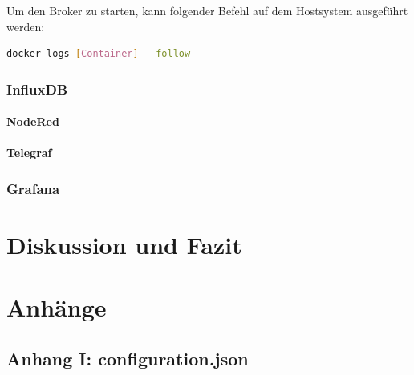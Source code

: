 \documentclass[a4paper, 12pt, oneside, toc=listofnumbered, bibliography=totoc]{scrbook}
\begin{document}
		Um den Broker zu starten, kann folgender Befehl auf dem Hostsystem ausgeführt werden:
		
		\begin{lstlisting}[numbers=none, language=bash, frame=single]
			docker logs [Container] --follow
		\end{lstlisting}
		
		
		\subsection{InfluxDB}
		
			\subsubsection{NodeRed}
		
			\subsubsection{Telegraf}
		
		\subsection{Grafana}
		
	
	\chapter{Diskussion und Fazit}\label{ch:Diskussion_Fazit}
	
	
	
	\printbibliography
	\frontmatter
	
	\pagebreak
	\chapter{Anhänge} %
	\section*{Anhang I: configuration.json} \label{Anhang1}
	
	\pagebreak
\end{document}

